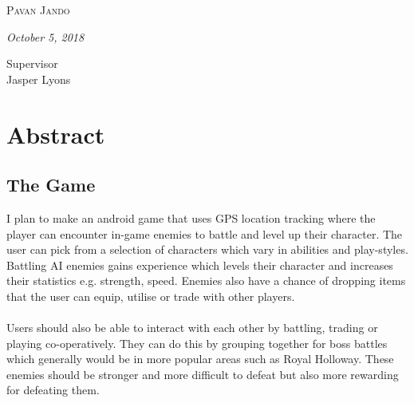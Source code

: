 \documentclass[a4paper]{report}
\begin{document}
\begin{titlepage}
	{\scshape\Large Pavan Jando \\} %
	
	\vspace{0.5\baselineskip} %
	
	\textit{October 5, 2018} %
	
	\vfill %
	
	
	
	\vspace{0.3\baselineskip} %
	
	Supervisor \\ Jasper Lyons
	
\end{titlepage}


\renewcommand{\thesection}{\arabic{section}}
\tableofcontents
\pagebreak

\section{Abstract}
\subsection{The Game}
I plan to make an android game that uses GPS location tracking where the player can encounter in-game enemies to battle and level up their character. The user can pick from a selection of characters which vary in abilities and play-styles. Battling AI enemies gains experience which levels their character and increases their statistics e.g. strength, speed. Enemies also have a chance of dropping items that the user can equip, utilise or trade with other players.
\\\\
Users should also be able to interact with each other by battling, trading or playing co-operatively. They can do this by grouping together for boss battles which generally would be in more popular areas such as Royal Holloway. These enemies should be stronger and more difficult to defeat but also more rewarding for defeating them.
\end{document}
